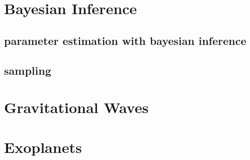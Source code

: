 

\section{Bayesian Inference}

\subsection{parameter estimation with bayesian inference}

\subsection{sampling}


\section{Gravitational Waves}

\section{Exoplanets}

